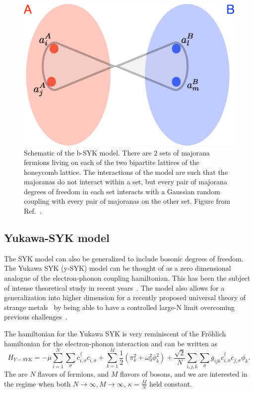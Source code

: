 \begin{figure}
    \centering
    \includegraphics[scale = 0.5]{figures/introduction/bSYK.png}
    \caption{Schematic of the b-SYK model. There are 2 sets of majorana fermions living on each of the two bipartite lattices of the honeycomb lattice. The interactions of the model are such that the majoranas do not interact within a set, but every pair of majorana degrees of freedom in each set interacts with a Gaussian random coupling with every pair of majoranas on the other set. Figure from Ref.~\cite{Fremling_2022}.}
    \label{fig:bsyk}
\end{figure}

\subsection{Yukawa-SYK model}
The SYK model can also be generalized to include bosonic degrees of freedom. The Yukawa SYK (y-SYK) model can be thought of as a zero dimensional analogue of the electron-phonon coupling hamiltonian. This has been the subject of intense theoretical study in recent years~\cite{esterlis2019cooper,wang2020quantum,wang2020solvable,classen2021superconductivity,inkof2022quantum,pan2021yukawa,davis2023quantum,grunwald2024dynamical,choi2022pairing}. The model also allows for a generalization into higher dimension for a recently proposed universal theory of strange metals~\cite{patel2023universal,valentinis2023correlation,esterlis2021large,guo2022large,guo2023large,li2024strange} by being able to have a controlled large-N limit overcoming previous challenges~\cite{lee2009low}.

\par
The hamiltonian for the Yukawa SYK is very reminiscent of the Fr\"ohlich hamiltonian for the electron-phonon interaction and can be written as 
\begin{equation}
    H_{Y-SYK} = -\mu\sum_{i=1}^N\sum_\sigma c^\dagger_{i,\sigma} c^{\phantom{\dagger}}_{i, \sigma} + \sum_{k=1}^M \frac{1}{2}\left(\pi_k^2 + \omega_0^2\phi_k^2\right) + \frac{\sqrt{2}}{N}\sum_{i,j,k}\sum_{\sigma}g_{ijk} c^\dagger_{i,\sigma} c^{\phantom{\dagger}}_{j,\sigma} \phi^{\phantom{\dagger}}_k .
    \label{eq:HYSYK}
\end{equation}
The are $N$ flavors of fermions, and $M$ flavors of bosons, and we are interested in the regime when both $N\rightarrow\infty, M\rightarrow\infty, \, \kappa = \frac{M}{N}$ held constant. 

